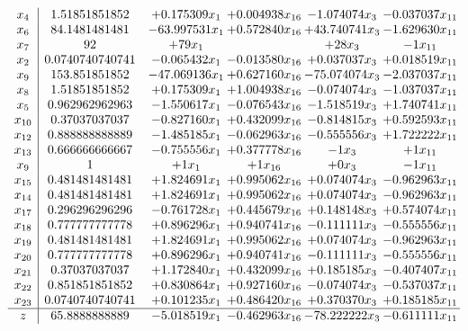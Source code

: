 \documentclass[11pt]{article}
\begin{document}
\[\begin{array}{c| c c@{\hskip 2pt} c@{\hskip 2pt} c@{\hskip 2pt} c@{\hskip 2pt} }
 x_{4}   &  1.51851851852 & + 0.175309 x_{1} & + 0.004938 x_{16} & -1.074074 x_{3} & -0.037037 x_{11}\\
 x_{6}   &  84.1481481481 & -63.997531 x_{1} & + 0.572840 x_{16} & + 43.740741 x_{3} & -1.629630 x_{11}\\
 x_{7}   &  92 & + 79 x_{1} &   & + 28 x_{3} & -1 x_{11}\\
 x_{2}   &  0.0740740740741 & -0.065432 x_{1} & -0.013580 x_{16} & + 0.037037 x_{3} & + 0.018519 x_{11}\\
 x_{9}   &  153.851851852 & -47.069136 x_{1} & + 0.627160 x_{16} & -75.074074 x_{3} & -2.037037 x_{11}\\
 x_{8}   &  1.51851851852 & + 0.175309 x_{1} & + 1.004938 x_{16} & -0.074074 x_{3} & -1.037037 x_{11}\\
 x_{5}   &  0.962962962963 & -1.550617 x_{1} & -0.076543 x_{16} & -1.518519 x_{3} & + 1.740741 x_{11}\\
 x_{10}   &  0.37037037037 & -0.827160 x_{1} & + 0.432099 x_{16} & -0.814815 x_{3} & + 0.592593 x_{11}\\
 x_{12}   &  0.888888888889 & -1.485185 x_{1} & -0.062963 x_{16} & -0.555556 x_{3} & + 1.722222 x_{11}\\
 x_{13}   &  0.666666666667 & -0.755556 x_{1} & + 0.377778 x_{16} & -1 x_{3} & + 1 x_{11}\\
 x_{9}   &  1 & + 1 x_{1} & + 1 x_{16} & + 0 x_{3} & -1 x_{11}\\
 x_{15}   &  0.481481481481 & + 1.824691 x_{1} & + 0.995062 x_{16} & + 0.074074 x_{3} & -0.962963 x_{11}\\
 x_{14}   &  0.481481481481 & + 1.824691 x_{1} & + 0.995062 x_{16} & + 0.074074 x_{3} & -0.962963 x_{11}\\
 x_{17}   &  0.296296296296 & -0.761728 x_{1} & + 0.445679 x_{16} & + 0.148148 x_{3} & + 0.574074 x_{11}\\
 x_{18}   &  0.777777777778 & + 0.896296 x_{1} & + 0.940741 x_{16} & -0.111111 x_{3} & -0.555556 x_{11}\\
 x_{19}   &  0.481481481481 & + 1.824691 x_{1} & + 0.995062 x_{16} & + 0.074074 x_{3} & -0.962963 x_{11}\\
 x_{20}   &  0.777777777778 & + 0.896296 x_{1} & + 0.940741 x_{16} & -0.111111 x_{3} & -0.555556 x_{11}\\
 x_{21}   &  0.37037037037 & + 1.172840 x_{1} & + 0.432099 x_{16} & + 0.185185 x_{3} & -0.407407 x_{11}\\
 x_{22}   &  0.851851851852 & + 0.830864 x_{1} & + 0.927160 x_{16} & -0.074074 x_{3} & -0.537037 x_{11}\\
 x_{23}   &  0.0740740740741 & + 0.101235 x_{1} & + 0.486420 x_{16} & + 0.370370 x_{3} & + 0.185185 x_{11}\\
\hline
z    &  65.8888888889 & -5.018519 x_{1} & -0.462963 x_{16} & -78.222222 x_{3} & -0.611111 x_{11}\\
\end{array}\]
\end{document}
